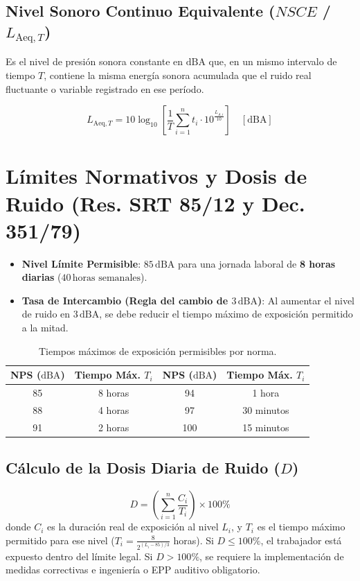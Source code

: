 \documentclass[]{informeutn}
\begin{document}
\subsection{Nivel Sonoro Continuo Equivalente (\texorpdfstring{$NSCE$}{NSCE} / \texorpdfstring{$L_{\text{Aeq},T}$}{LAeq,T})}
\begin{tcolorbox}[title=Definición de NSCE / $L_{\text{Aeq},T}$]
Es el nivel de presión sonora constante en $\text{dBA}$ que, en un mismo intervalo de tiempo $T$, contiene la misma energía sonora acumulada que el ruido real fluctuante o variable registrado en ese período.
\end{tcolorbox}
\begin{equation}
L_{\text{Aeq},T} = 10 \log_{10} \left[ \frac{1}{T} \sum_{i=1}^n t_i \cdot 10^{\frac{L_{A,i}}{10}} \right] \quad [\text{dBA}]
\end{equation}

\section{Límites Normativos y Dosis de Ruido (Res. SRT 85/12 y Dec. 351/79)}
\begin{itemize}
    \item \textbf{Nivel Límite Permisible}: \textbf{$85\,\text{dBA}$} para una jornada laboral de \textbf{8 horas diarias} ($40\,\text{horas semanales}$).
    \item \textbf{Tasa de Intercambio (Regla del cambio de $3\,\text{dBA}$)}: Al aumentar el nivel de ruido en $3\,\text{dBA}$, se debe reducir el tiempo máximo de exposición permitido a la mitad.
\end{itemize}

\begin{table}[H]
\centering
\begin{tabular}{|c|c||c|c|}
\hline
\rowcolor{blue!15}\textbf{NPS ($\text{dBA}$)} & \textbf{Tiempo Máx. $T_i$} & \textbf{NPS ($\text{dBA}$)} & \textbf{Tiempo Máx. $T_i$} \\ \hline
85 & 8 horas & 94 & 1 hora \\ \hline
88 & 4 horas & 97 & 30 minutos \\ \hline
91 & 2 horas & 100 & 15 minutos \\ \hline
\end{tabular}
\caption{Tiempos máximos de exposición permisibles por norma.}
\end{table}

\subsection{Cálculo de la Dosis Diaria de Ruido (\texorpdfstring{$D$}{D})}
\begin{equation}
D = \left( \sum_{i=1}^n \frac{C_i}{T_i} \right) \times 100\%
\end{equation}
donde $C_i$ es la duración real de exposición al nivel $L_i$, y $T_i$ es el tiempo máximo permitido para ese nivel ($T_i = \frac{8}{2^{(L_i - 85)/3}}$ horas).
Si $D \le 100\%$, el trabajador está expuesto dentro del límite legal. Si $D > 100\%$, se requiere la implementación de medidas correctivas e ingeniería o EPP auditivo obligatorio.
\end{document}
